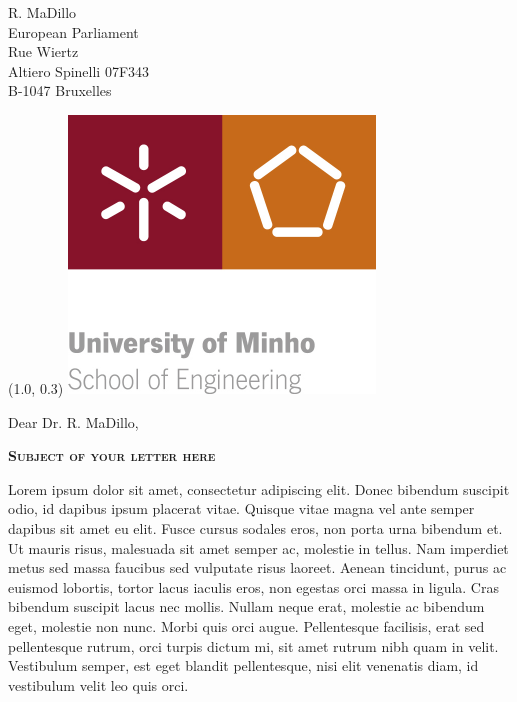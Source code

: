 \documentclass[a4paper,12pt]{letter}
\date{February 31, 2013}
\begin{document}
\begin{letter}{
    R. MaDillo\\
    European Parliament\\
    Rue Wiertz\\
    Altiero Spinelli 07F343\\
    B-1047 Bruxelles 
  }

	\begin{textblock}{10}(1.0, 0.3)
		\includegraphics{logo}
	\end{textblock}

  \opening{Dear Dr. R. MaDillo,}
{
  \begin{center}
    \textbf{\textsc{Subject of your letter here}}\\[2em]
  \end{center}
}
% 
%

Lorem ipsum dolor sit amet, consectetur adipiscing elit. Donec bibendum 
suscipit odio, id dapibus ipsum placerat vitae. Quisque vitae magna vel ante 
semper dapibus sit amet eu elit. Fusce cursus sodales eros, non porta urna 
bibendum et. Ut mauris risus, malesuada sit amet semper ac, molestie in 
tellus. Nam imperdiet metus sed massa faucibus sed vulputate risus laoreet. 
Aenean tincidunt, purus ac euismod lobortis, tortor lacus iaculis eros, non 
egestas orci massa in ligula. Cras bibendum suscipit lacus nec mollis. Nullam 
neque erat, molestie ac bibendum eget, molestie non nunc. Morbi quis orci 
augue. Pellentesque facilisis, erat sed pellentesque rutrum, orci turpis 
dictum mi, sit amet rutrum nibh quam in velit. Vestibulum semper, est eget 
blandit pellentesque, nisi elit venenatis diam, id vestibulum velit leo quis 
orci. 


\end{letter}
\end{document}
